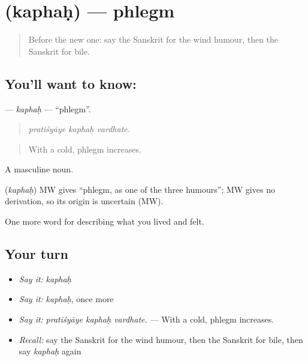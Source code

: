 \section[\texorpdfstring{\sk{कफः} (kaphaḥ)}{कफः (kaphaḥ)}]{ (kaphaḥ) — phlegm}

\label{lesson:SA-C484-kaphah}



\begin{quote}
Before the new one: say the Sanskrit for the wind humour, then the Sanskrit for bile.
\end{quote}

\subsection*{You'll want to know: }
\textbf{} — \emph{kaphaḥ} — \textquotedblleft{}phlegm\textquotedblright{}.

\begin{quote}
  
\end{quote}

\begin{quote}
\emph{pratiśyāye kaphaḥ vardhate.}
\end{quote}

\begin{quote}
With a cold, phlegm increases.
\end{quote}

A masculine noun.

\begin{cousinweb}
\textbf{} (\emph{kaphaḥ}) MW gives \textquotedblleft{}phlegm, as one of the three humours\textquotedblright{}; MW gives no derivation, so its origin is uncertain (MW).
\end{cousinweb}

\begin{grammarlens}[title={What you've built}]
One more word for describing what you lived and felt.
\end{grammarlens}

\subsection*{Your turn}
\begin{itemize}
\raggedright
  \item \emph{Say it:} \emph{kaphaḥ}
  \item \emph{Say it:} \emph{kaphaḥ}, once more
  \item \emph{Say it:} \emph{pratiśyāye kaphaḥ vardhate.} — With a cold, phlegm increases.
  \item \emph{Recall:} say the Sanskrit for the wind humour, then the Sanskrit for bile, then say \emph{kaphaḥ} again
\end{itemize}

